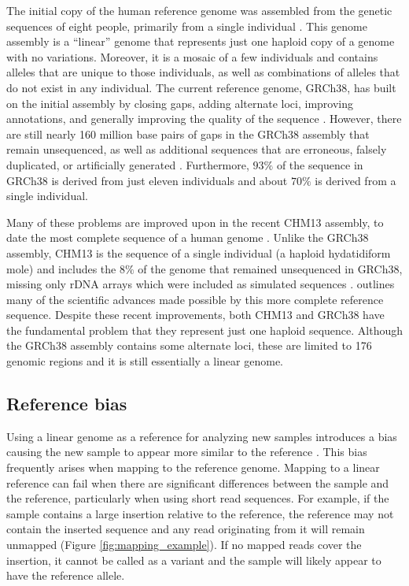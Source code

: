 \documentclass[11pt]{ucscthesis}
\begin{document}
The initial copy of the human reference genome was assembled from the genetic sequences of eight people, primarily from a single individual \cite{lander_initial_2001}.
This genome assembly is a ``linear'' genome that represents just one haploid copy of a genome with no variations.
Moreover, it is a mosaic of a few individuals and contains alleles that are unique to those individuals, as well as combinations of alleles that do not exist in any individual.
The current reference genome, GRCh38, has built on the initial assembly by closing gaps, adding alternate loci, improving annotations, and generally improving the quality of the sequence \cite{schneider_evaluation_2017}.
However, there are still nearly 160 million base pairs of gaps in the GRCh38 assembly that remain unsequenced, as well as additional sequences that are erroneous, falsely duplicated, or artificially generated \cite{schneider_evaluation_2017,nurk_complete_2022}.
Furthermore, $93\%$ of the sequence in GRCh38 is derived from just eleven individuals and about $70\%$ is derived from a single individual.

Many of these problems are improved upon in the recent CHM13 assembly, to date the most complete sequence of a human genome \cite{nurk_complete_2022}.
Unlike the GRCh38 assembly, CHM13 is the sequence of a single individual (a haploid hydatidiform mole) and includes the $8\%$ of the genome that remained unsequenced in GRCh38, missing only rDNA arrays which were included as simulated sequences \cite{nurk_complete_2022}.
\citet{taylor_beyond_2024} outlines many of the scientific advances made possible by this more complete reference sequence.
Despite these recent improvements, both CHM13 and GRCh38 have the fundamental problem that they represent just one haploid sequence.
Although the GRCh38 assembly contains some alternate loci, these are limited to 176 genomic regions \cite{schneider_evaluation_2017} and it is still essentially a linear genome.

\subsection{Reference bias}

Using a linear genome as a reference for analyzing new samples introduces a bias causing the new sample to appear more similar to the reference \cite{ballouz_is_2019,noauthor_computational_2016,eizenga_pangenome_2020}.
This bias frequently arises when mapping to the reference genome.
Mapping to a linear reference can fail when there are significant differences between the sample and the reference, particularly when using short read sequences.
For example, if the sample contains a large insertion relative to the reference, the reference may not contain the inserted sequence and any read originating from it will remain unmapped (Figure \ref{fig:mapping_example}).
If no mapped reads cover the insertion, it cannot be called as a variant and the sample will likely appear to have the reference allele.
\end{document}
